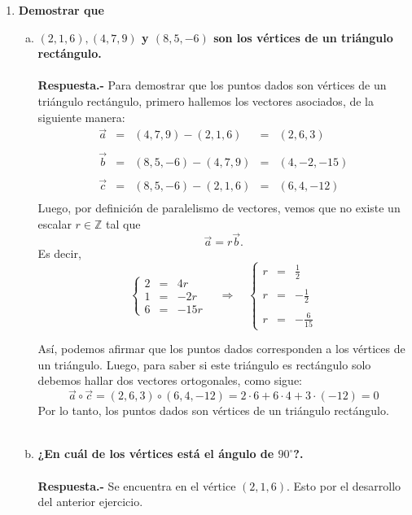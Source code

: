 \begin{enumerate}
\item \textbf{\boldmath Demostrar que}
    \begin{enumerate}[a)]

	\item \textbf{\boldmath $(2,1,6), (4,7,9)$ y $(8,5,-6)$ son los vértices de un triángulo rectángulo.\\\\
	    Respuesta.-}\; Para demostrar que los puntos dados son vértices de un triángulo rectángulo, primero hallemos los vectores asociados, de la siguiente manera:
	    $$\begin{array}{rcccl}
		\vec{a} &=& (4,7,9)-(2,1,6) &=& (2,6,3)\\\\
		\vec{b} &=& (8,5,-6)-(4,7,9) &=& (4,-2,-15)\\\\
		\vec{c} &=& (8,5,-6)-(2,1,6) &=& (6,4,-12)\\
	    \end{array}$$
	    Luego, por definición de paralelismo de vectores, vemos que no existe un escalar $r\in \mathbb{Z}$ tal que 
	    $$\vec{a}=r\vec{b}.$$
	    Es decir,
	    $$\left\{\begin{array}{crr}
		    2&=&4r\\
		    1&=&-2r\\
		    6&=&-15r
		\end{array}\right. \quad \Rightarrow \quad
		\left\{\begin{array}{rcr}
		    r&=&\frac{1}{2}\\\\
		    r&=&-\frac{1}{2}\\\\
		    r&=&-\frac{6}{15}
		\end{array}\right.$$

	Así, podemos afirmar que los puntos dados corresponden a los vértices de un triángulo. Luego, para saber si este triángulo es rectángulo solo debemos hallar dos vectores ortogonales, como sigue:
	$$\vec{a}\circ \vec{c} =  (2,6,3)\circ (6,4,-12) = 2\cdot 6 + 6\cdot 4+3\cdot (-12) = 0$$
	Por lo tanto, los puntos dados son vértices de un triángulo rectángulo.\\\\

	\item \textbf{\boldmath ¿En cuál de los vértices está el ángulo de $90^\circ$?.\\\\
	    Respuesta.-}\; Se encuentra en el vértice $(2,1,6)$. Esto por el desarrollo del anterior ejercicio.\\\\


\end{enumerate}
\end{enumerate}
